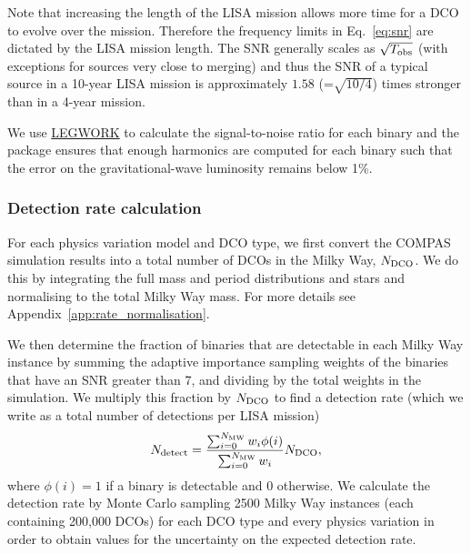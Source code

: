 Note that increasing the length of the LISA mission allows more time for a DCO to evolve over the mission. Therefore the frequency limits in Eq.~\ref{eq:snr} are dictated by the LISA mission length. The SNR generally scales as $\sqrt{T_{\rm obs}}$ (with exceptions for sources very close to merging) and thus the SNR of a typical source in a 10-year LISA mission is approximately $1.58$ (=$\sqrt{10/4}$) times stronger than in a 4-year mission.

We use \href{https://legwork.readthedocs.io/en/latest/}{LEGWORK} \citep{Wagg+2021} to calculate the signal-to-noise ratio for each binary and the package ensures that enough harmonics are computed for each binary such that the error on the gravitational-wave luminosity remains below 1\%.

\subsubsection{Detection rate calculation}
For each physics variation model and DCO type, we first convert the COMPAS simulation results into a total number of DCOs in the Milky Way, $N_{\rm DCO}$. We do this by integrating the full mass and period distributions and stars and normalising to the total Milky Way mass. For more details see Appendix~\ref{app:rate_normalisation}.

We then determine the fraction of binaries that are detectable in each Milky Way instance by summing the adaptive importance sampling weights of the binaries that have an SNR greater than 7, and dividing by the total weights in the simulation. We multiply this fraction by $N_{\rm DCO}$ to find a detection rate (which we write as a total number of detections per LISA mission)
\begin{equation}
    N_{\rm detect} = \frac{\sum_{i = 0}^{N_{\rm MW}} w_i \phi(i)}{\sum_{i = 0}^{N_{\rm MW}} w_i} N_{\rm DCO},
\end{equation}
where $\phi(i) = 1$ if a binary is detectable and $0$ otherwise. We calculate the detection rate by Monte Carlo sampling 2500 Milky Way instances (each containing 200,000 DCOs) for each DCO type and every physics variation in order to obtain values for the uncertainty on the expected detection rate.